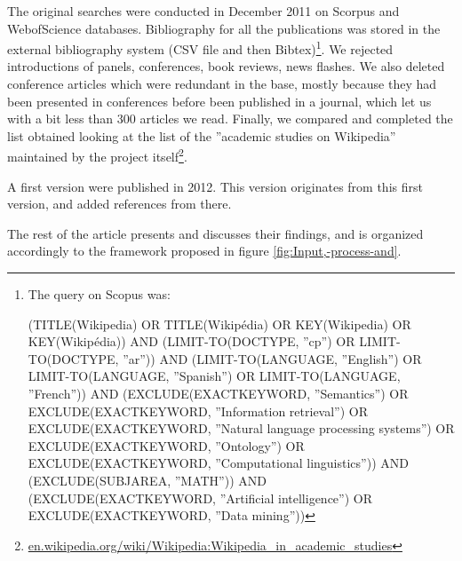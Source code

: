 The original searches were conducted in December 2011 on Scorpus and WebofScience
databases. Bibliography for all the publications was stored in the
external bibliography system (CSV file and then Bibtex)\footnote{The query on Scopus was:

(TITLE(Wikipedia) OR TITLE(Wikip{\'{e}}dia) OR KEY(Wikipedia) OR KEY(Wikipédia))
AND (LIMIT-TO(DOCTYPE, ''cp'') OR LIMIT-TO(DOCTYPE,
''ar'')) AND (LIMIT-TO(LANGUAGE, ''English'')
OR LIMIT-TO(LANGUAGE, ''Spanish'') OR LIMIT-TO(LANGUAGE,
''French'')) AND (EXCLUDE(EXACTKEYWORD,
''Semantics'') OR EXCLUDE(EXACTKEYWORD,
''Information retrieval'') OR EXCLUDE(EXACTKEYWORD,
''Natural language processing systems'')
OR EXCLUDE(EXACTKEYWORD, ''Ontology'') OR
EXCLUDE(EXACTKEYWORD, ''Computational linguistics''))
AND (EXCLUDE(SUBJAREA, ''MATH'')) AND (EXCLUDE(EXACTKEYWORD,
''Artificial intelligence'') OR EXCLUDE(EXACTKEYWORD,
''Data mining''))}. We rejected introductions of panels, conferences, book reviews,
news flashes. We also deleted conference articles which were redundant
in the base, mostly because they had been presented in conferences
before been published in a journal, which let us with a bit less than
300 articles we read. Finally, we compared and completed the list
obtained looking at the list of the ''academic studies on Wikipedia''
maintained by the project itself\footnote{\url{en.wikipedia.org/wiki/Wikipedia:Wikipedia_in_academic_studies}}.

A first version were published in 2012. This version originates from this first version, and added references from there.

The rest of the article presents and discusses their findings, and
is organized accordingly to the framework proposed in figure \ref{fig:Input,-process-and}.
